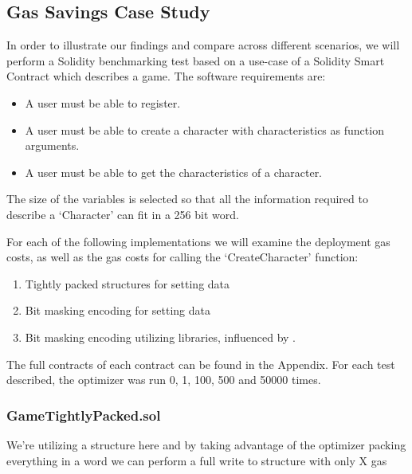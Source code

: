 \subsection{Gas Savings Case Study}
In order to illustrate our findings and compare across different scenarios, we will perform a Solidity benchmarking test based on a use-case of a Solidity Smart Contract which describes a game. The software requirements are: 
\begin{itemize}
    \item A user must be able to register.
    \item A user must be able to create a character with characteristics as function arguments.
    \item A user must be able to get the characteristics of a character.
\end{itemize}%


The size of the variables is selected so that all the information required to describe a `Character' can fit in a 256 bit word.

For each of the following implementations we will examine the deployment gas costs, as well as the gas costs for calling the `CreateCharacter' function:

\begin{enumerate}
    \item Tightly packed structures for setting data
    \item Bit masking encoding for setting data
    \item Bit masking encoding utilizing libraries, influenced by \cite{virtualstruct}.
\end{enumerate}

The full contracts of each contract can be found in the Appendix. 
For each test described, the optimizer was run 0, 1, 100, 500 and 50000 times.
% 
\subsubsection{GameTightlyPacked.sol}
We're utilizing a structure here and by taking advantage of the optimizer packing everything in a word we can perform a full write to structure with only X gas 


